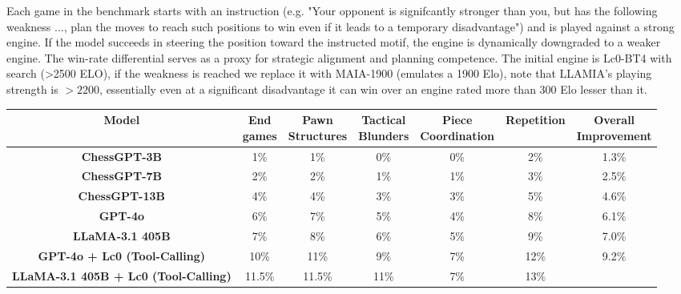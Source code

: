 \documentclass{article}
\newcommand{\valgood}[1]{\colorbox{valgood}{#1}}
\theoremstyle{plain}
\theoremstyle{definition}
\theoremstyle{remark}
\begin{document}
Each game in the benchmark starts with an instruction (e.g. "Your opponent is signifcantly stronger than you, but has the following weakness ..., plan the moves to reach such positions to win even if it leads to a temporary disadvantage") and is played against a strong engine. If the model succeeds in steering the position toward the instructed motif, the engine is dynamically downgraded to a weaker engine. The win-rate differential serves as a proxy for strategic alignment and planning competence. The initial engine is Lc0-BT4 with search (>2500 ELO), if the weakness is reached we replace it with MAIA-1900 (emulates a 1900 Elo), note that LLAMIA's playing strength is $>2200$, essentially even at a significant disadvantage it can win over an engine rated more than 300 Elo lesser than it.

\begin{table}[h]
    \centering
    \begin{adjustbox}{max width=1.05\textwidth}
    \begin{tabular}{c|ccccc|c}
    \toprule[1.2pt]
        \textbf{Model} 
        & \makecell{\textbf{End}\\\textbf{games}} 
        & \makecell{\textbf{Pawn}\\\textbf{Structures}} 
        & \makecell{\textbf{Tactical}\\\textbf{Blunders}} 
        & \makecell{\textbf{Piece}\\\textbf{Coordination}} 
        & \textbf{Repetition} 
        & \makecell{\textbf{Overall}\\\textbf{Improvement}} \\ 
    \midrule
        \textbf{ChessGPT-3B} 
        & 1\% & 1\% & 0\% & 0\% & 2\% 
        & 1.3\% \\
        \textbf{ChessGPT-7B} 
        & 2\% & 2\% & 1\% & 1\% & 3\% 
        & 2.5\% \\
        \textbf{ChessGPT-13B} 
        & 4\% & 4\% & 3\% & 3\% & 5\% 
        & 4.6\% \\\midrule
        \textbf{GPT-4o} 
        & 6\% & 7\% & 5\% & 4\% & 8\% 
        & 6.1\% \\
        \textbf{LLaMA-3.1 405B} 
        & 7\% & 8\% & 6\% & 5\% & 9\% 
        & 7.0\% \\
    \midrule
        \textbf{GPT-4o + Lc0 (Tool-Calling)} 
        & 10\% & 11\% & 9\% & 7\% & 12\% 
        & 9.2\% \\
        \textbf{LLaMA-3.1 405B + Lc0 (Tool-Calling)} 
        & \valgood{11.5\%} & 11.5\% & \valgood{11\%} & 7\% & \valgood{13\%} 

\end{tabular}
\end{adjustbox}
\end{table}
\end{document}
